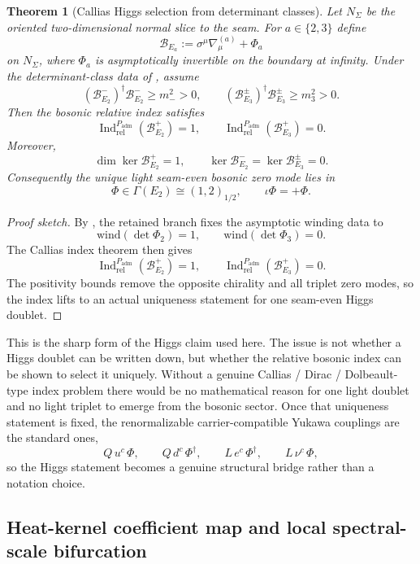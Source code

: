\documentclass[11pt,a4paper]{article}
\newtheorem{theorem}{Theorem}[section]
\theoremstyle{definition}
\theoremstyle{remark}
\DeclareMathOperator{\Ind}{Ind}
\newcommand{\Seam}{\Sigma}
\newcommand{\inv}{\iota}
\newcommand{\Padm}{P_{\mathrm{adm}}}
\begin{document}
\begin{theorem}[Callias Higgs selection from determinant classes]
\label{thm:callias-higgs-selection}
Let $N_\Seam$ be the oriented two-dimensional normal slice to the seam. For $a\in\{2,3\}$ define
\[
\mathcal B_{E_a}:=\sigma^\mu\nabla^{(a)}_\mu+\Phi_a
\]
on $N_\Seam$, where $\Phi_a$ is asymptotically invertible on the boundary at infinity. Under the determinant-class data of , assume
\[
(\mathcal B_{E_2}^-)^\dagger\mathcal B_{E_2}^-\ge m_-^2>0,
\qquad
(\mathcal B_{E_3}^{\pm})^\dagger\mathcal B_{E_3}^{\pm}\ge m_3^2>0.
\]
Then the bosonic relative index satisfies
\[
\Ind_{\mathrm{rel}}^{\Padm}(\mathcal B_{E_2}^+)=1,
\qquad
\Ind_{\mathrm{rel}}^{\Padm}(\mathcal B_{E_3}^+)=0.
\]
Moreover,
\[
\dim\ker\mathcal B_{E_2}^+=1,
\qquad
\ker\mathcal B_{E_2}^-=\ker\mathcal B_{E_3}^{\pm}=0.
\]
Consequently the unique light seam-even bosonic zero mode lies in
\[
\Phi\in\Gamma(E_2)\cong (1,2)_{1/2},
\qquad
\inv\Phi=+\Phi.
\]
\end{theorem}

\begin{proof}[Proof sketch]
By , the retained branch fixes the asymptotic winding data to
\[
\mathrm{wind}(\det\Phi_2)=1,
\qquad
\mathrm{wind}(\det\Phi_3)=0.
\]
The Callias index theorem then gives
\[
\Ind_{\mathrm{rel}}^{\Padm}(\mathcal B_{E_2}^+)=1,
\qquad
\Ind_{\mathrm{rel}}^{\Padm}(\mathcal B_{E_3}^+)=0.
\]
The positivity bounds remove the opposite chirality and all triplet zero modes, so the index lifts to an actual uniqueness statement for one seam-even Higgs doublet.
\end{proof}

This is the sharp form of the Higgs claim used here. The issue is not whether a Higgs doublet can be written down, but whether the relative bosonic index can be shown to select it uniquely.
Without a genuine Callias / Dirac / Dolbeault-type index problem there would be no mathematical reason for one light doublet and no light triplet to emerge from the bosonic sector. Once that uniqueness statement is fixed, the renormalizable carrier-compatible Yukawa couplings are the standard ones,
\[
Q\,u^c\,\Phi,
\qquad
Q\,d^c\,\Phi^\dagger,
\qquad
L\,e^c\,\Phi^\dagger,
\qquad
L\,\nu^c\,\Phi,
\]
so the Higgs statement becomes a genuine structural bridge rather than a notation choice.

\subsection{Heat-kernel coefficient map and local spectral-scale bifurcation}
\end{document}
